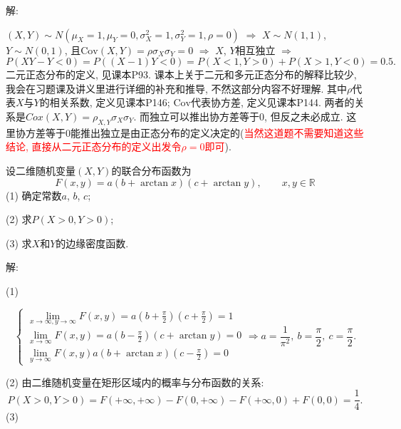 \documentclass[standard]{ExBook}
\begin{document}
\begin{qitems}
\vspace{-5em}

    \begin{bbox}
解: 

$(X,Y)\sim N(\mu_{X}=1,\mu_{Y}=0,\sigma_{X}^{2}=1,\sigma_{Y}^{2}=1,\rho=0)$ $\Longrightarrow$ $X\sim N(1,1)$, $Y\sim N(0,1)$, 且$\mathrm{Cov}(X,Y)=\rho\sigma_{X}\sigma_{Y}=0$ $\Longrightarrow$ $X$, $Y$相互独立 $\Longrightarrow$
$$P(XY-Y<0)=P((X-1)Y<0)=P(X<1,Y>0)+P(X>1,Y<0)=0.5.$$
\textcolor{themeColor}{\selectfont {} 二元正态分布的定义, 见课本P93. 课本上关于二元和多元正态分布的解释比较少, 我会在习题课及讲义里进行详细的补充和推导, 不然这部分内容不好理解. 其中$\rho$代表$X$与$Y$的相关系数, 定义见课本P146; $\mathrm{Cov}$代表协方差, 定义见课本P144. 两者的关系是$Cox(X,Y)=\rho_{X,Y}\sigma_{X}\sigma_{Y}$. 而独立可以推出协方差等于0, 但反之未必成立. 这里协方差等于0能推出独立是由正态分布的定义决定的(\textcolor{red}{当然这道题不需要知道这些结论, 直接从二元正态分布的定义出发令$\rho=0$即可}).}
    \end{bbox}

\vspace{-5em}

    \begin{bbox}
    \begin{shaded}
        \qitem
设二维随机变量$(X,Y)$的联合分布函数为
$$F(x,y)=a(b+\arctan x)(c+\arctan y),\qquad x,y\in\mathbb{R}$$
(1) 确定常数$a$, $b$, $c$;

(2) 求$P(X>0,Y>0)$;

(3) 求$X$和$Y$的边缘密度函数.
    \end{shaded}
    \end{bbox}

\vspace{-5em}

    \begin{bbox}
解: 

(1) 
\vspace{-2em}
\begin{center}
\begin{equation}
    \left\{
    \begin{array}{l}
        \nonumber
        \lim\limits_{x\to\infty,y\to\infty}F(x,y)=a(b+\frac{\pi}{2})(c+\frac{\pi}{2})=1\\
        \lim\limits_{x\to\infty}F(x,y)=a(b-\frac{\pi}{2})(c+\arctan y)=0\\
        \lim\limits_{y\to\infty}F(x,y)a(b+\arctan x)(c-\frac{\pi}{2})=0
    \end{array}
    \right.
    \Longrightarrow
    a=\frac{1}{\pi^2},\ b=\frac{\pi}{2},\ c=\frac{\pi}{2}.
\end{equation}
\end{center}
(2) 由二维随机变量在矩形区域内的概率与分布函数的关系:
$$P(X>0,Y>0)=F(+\infty,+\infty)-F(0,+\infty)-F(+\infty,0)+F(0,0)=\frac{1}{4}.$$
(3)


\end{bbox}
\end{qitems}
\end{document}
